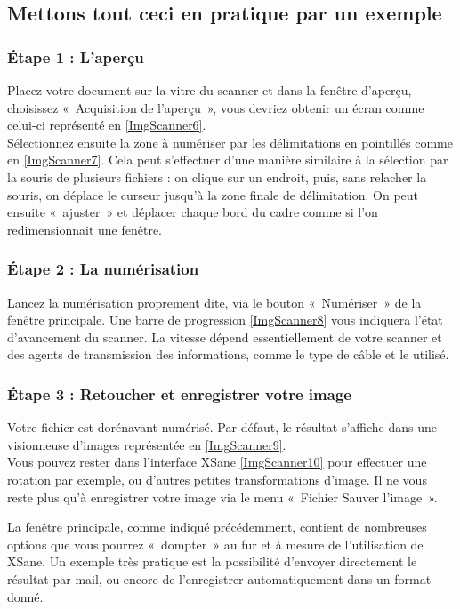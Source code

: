 \subsection{Mettons tout ceci en pratique par un exemple}
\subsubsection{Étape 1 : L'aperçu}
Placez votre document sur la vitre du scanner et dans la fenêtre d'aperçu, choisissez «~Acquisition de l'aperçu~», vous devriez obtenir un écran comme celui-ci représenté en \ref{ImgScanner6}.\\
Sélectionnez ensuite la zone à numériser par les délimitations en pointillés comme en \ref{ImgScanner7}. Cela peut s'effectuer d'une manière similaire à la sélection par la souris de plusieurs fichiers : on clique sur un endroit, puis, sans relacher la souris, on déplace le curseur jusqu'à la zone finale de délimitation. On peut ensuite «~ajuster~» et déplacer chaque bord du cadre comme si l'on redimensionnait une fenêtre.\par
\ScannerEtapeUn
\subsubsection{Étape 2 : La numérisation}
Lancez la numérisation proprement dite, via le bouton «~Numériser~» de la fenêtre principale. Une barre de progression \ref{ImgScanner8} vous indiquera l'état d'avancement du scanner. La vitesse dépend essentiellement de votre scanner et des agents de transmission des informations, comme le type de câble et le  utilisé.\par
{}
\subsubsection{Étape 3 : Retoucher et enregistrer votre image}
Votre fichier est dorénavant numérisé. Par défaut, le résultat s'affiche dans une visionneuse d'images représentée en \ref{ImgScanner9}.\\
Vous pouvez rester dans l'interface XSane \ref{ImgScanner10} pour effectuer une rotation par exemple, ou d'autres petites transformations d'image. Il ne vous reste plus qu'à enregistrer votre image via le menu «~Fichier \FlecheDroite Sauver l'image~».\par
\ScannerEtapeDeux
\begin{nota}
La fenêtre principale, comme indiqué précédemment, contient de nombreuses options que vous pourrez «~dompter~» au fur et à mesure de l'utilisation de XSane. Un exemple très pratique est la possibilité d'envoyer directement le résultat par mail, ou encore de l'enregistrer automatiquement dans un format donné.
\end{nota}
